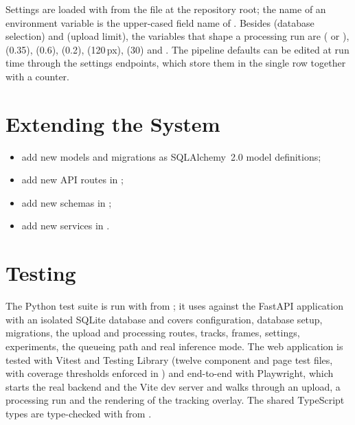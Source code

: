 Settings are loaded with  from the  file at the repository root; the name of an environment variable is the upper-cased field name of . Besides  (database selection) and  (upload limit), the variables that shape a processing run are  ( or ),  (0.35),  (0.6),  (0.2),  (120\,px),  (30) and . The pipeline defaults can be edited at run time through the settings endpoints, which store them in the single  row together with a  counter.


\section{Extending the System}

\begin{itemize}
  \item add new models and migrations as SQLAlchemy~2.0 model definitions;
  \item add new API routes in ;
  \item add new schemas in ;
  \item add new services in .
\end{itemize}

\section{Testing}

The Python test suite is run with  from ; it uses  against the FastAPI application with an isolated SQLite database and covers configuration, database setup, migrations, the upload and processing routes, tracks, frames, settings, experiments, the queueing path and real inference mode. The web application is tested with Vitest and Testing Library (twelve component and page test files, with coverage thresholds enforced in ) and end-to-end with Playwright, which starts the real backend and the Vite dev server and walks through an upload, a processing run and the rendering of the tracking overlay. The shared TypeScript types are type-checked with  from .

